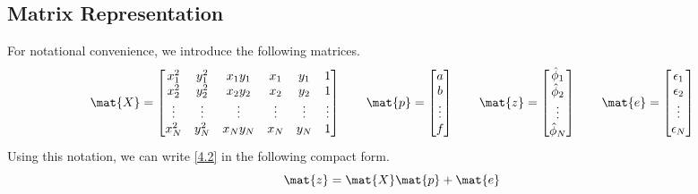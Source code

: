 \documentclass[12pt]{article}
\begin{document}
\subsection{Matrix Representation}
For notational convenience, we introduce the following matrices.
%
\begin{equation}\label{4.3}
    \mat{X} =
    \begin{bmatrix}
        x_1^2  & y_1^2  & x_1y_1 & x_1    & y_1    & 1 \\
        x_2^2  & y_2^2  & x_2y_2 & x_2    & y_2    & 1 \\
        \vdots & \vdots & \vdots & \vdots & \vdots & \vdots \\
        x_N^2  & y_N^2  & x_Ny_N & x_N    & y_N    & 1
    \end{bmatrix}
    \qquad
    \mat{p} =
    \begin{bmatrix}
        a \\
        b \\
        \vdots \\
        f
    \end{bmatrix}
    \qquad
    \mat{z} =
    \begin{bmatrix}
        \hat{\phi}_1 \\
        \hat{\phi}_2 \\
        \vdots \\
        \hat{\phi}_N \\
    \end{bmatrix}
    \qquad
    \mat{e} =
    \begin{bmatrix}
        \epsilon_1 \\
        \epsilon_2 \\
        \vdots \\
        \epsilon_N \\
    \end{bmatrix}
\end{equation}
%
Using this notation, we can write \eqref{4.2} in the following compact form.
%
\begin{equation}\label{4.4}
    \mat{z} = \mat{X} \mat{p} + \mat{e}
\end{equation}

\end{document}
